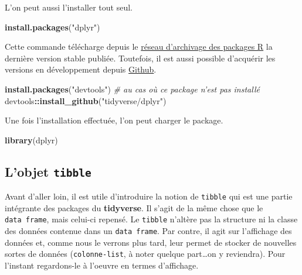 \documentclass[]{book}
\newenvironment{Shaded}{\begin{snugshade}}{\end{snugshade}}
\newcommand{\KeywordTok}[1]{\textcolor[rgb]{0.13,0.29,0.53}{\textbf{#1}}}
\newcommand{\StringTok}[1]{\textcolor[rgb]{0.31,0.60,0.02}{#1}}
\newcommand{\CommentTok}[1]{\textcolor[rgb]{0.56,0.35,0.01}{\textit{#1}}}
\newcommand{\OperatorTok}[1]{\textcolor[rgb]{0.81,0.36,0.00}{\textbf{#1}}}
\newcommand{\NormalTok}[1]{#1}
\begin{document}
L'on peut aussi l'installer tout seul.

\begin{Shaded}
\begin{Highlighting}[]
\KeywordTok{install.packages}\NormalTok{(}\StringTok{"dplyr"}\NormalTok{)}
\end{Highlighting}
\end{Shaded}

Cette commande télécharge depuis le
\href{https://cran.r-project.org/}{réseau d'archivage des packages R} la
dernière version stable publiée. Toutefois, il est aussi possible
d'acquérir les versions en développement depuis
\href{https://github.com/tidyverse/dplyr}{Github}.

\begin{Shaded}
\begin{Highlighting}[]
\KeywordTok{install.packages}\NormalTok{(}\StringTok{"devtools"}\NormalTok{) }\CommentTok{# au cas où ce package n'est pas installé}
\NormalTok{devtools}\OperatorTok{::}\KeywordTok{install_github}\NormalTok{(}\StringTok{"tidyverse/dplyr"}\NormalTok{)}
\end{Highlighting}
\end{Shaded}

Une fois l'installation effectuée, l'on peut charger le package.

\begin{Shaded}
\begin{Highlighting}[]
\KeywordTok{library}\NormalTok{(dplyr)}
\end{Highlighting}
\end{Shaded}

\subsection{\texorpdfstring{L'objet
\texttt{tibble}}{L'objet tibble}}\label{lobjet-tibble}

Avant d'aller loin, il est utile d'introduire la notion de
\texttt{tibble} qui est une partie intégrante des packages du
\textbf{tidyverse}. Il s'agit de la même chose que le
\texttt{data\ frame}, mais celui-ci repensé. Le \texttt{tibble} n'altère
pas la structure ni la classe des données contenue dans un
\texttt{data\ frame}. Par contre, il agit sur l'affichage des données
et, comme nous le verrons plus tard, leur permet de stocker de nouvelles
sortes de données (\texttt{colonne-list}, à noter quelque part\ldots{}on
y reviendra). Pour l'instant regardons-le à l'oeuvre en termes
d'affichage.
\end{document}
